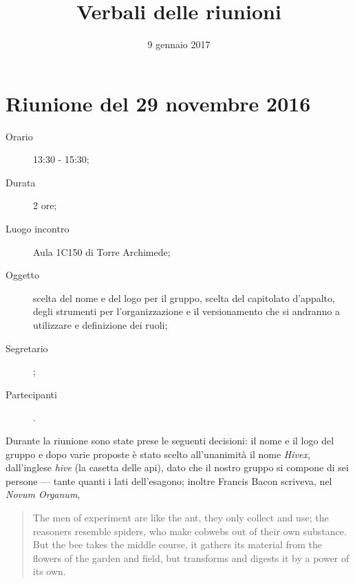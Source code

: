 


\author{\PB}
\supervisor{\MM}
\title{Verbali delle riunioni}
\date{9 gennaio 2017}



\maketitle
\tableofcontents
\newpage

\section{Riunione del 29 novembre 2016}

\begin{description}
	\item[Orario] 13:30 - 15:30;
	\item[Durata] 2 ore;
	\item[Luogo incontro] Aula 1C150 di Torre Archimede; 
	\item[Oggetto] scelta del nome e del logo per il gruppo, scelta del capitolato d'appalto, degli strumenti per l'organizzazione e il versionamento che si andranno a utilizzare e definizione dei ruoli;
	\item[Segretario] \LB; 
	\item[Partecipanti] \ALL.
\end{description}

Durante la riunione sono state prese le seguenti decisioni:
il nome e il logo del gruppo e dopo varie proposte è stato scelto all'unanimità il nome \emph{Hivex}, dall'inglese \emph{hive} (la casetta delle api), dato che il nostro gruppo si compone di sei persone --- tante quanti i lati dell'esagono; inoltre Francis Bacon scriveva, nel \emph{Novum Organum},
\begin{quote}
	The men of experiment are like the ant, they only collect and use; the reasoners resemble spiders, who make cobwebs out of their own substance. But the bee takes the middle course, it gathers its material from the flowers of the garden and field, but transforms and digests it by a power of its own.
\end{quote}

